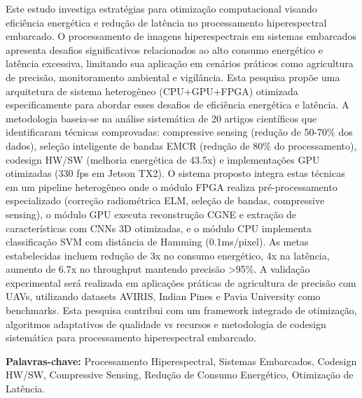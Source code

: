 \documentclass[12pt,Final,Portugues]{tese-FT}
\begin{document}
\begin{resumo}

Este estudo investiga estratégias para otimização computacional visando eficiência energética e redução de latência no processamento hiperespectral embarcado. O processamento de imagens hiperespectrais em sistemas embarcados apresenta desafios significativos relacionados ao alto consumo energético e latência excessiva, limitando sua aplicação em cenários práticos como agricultura de precisão, monitoramento ambiental e vigilância. Esta pesquisa propõe uma arquitetura de sistema heterogêneo (CPU+GPU+FPGA) otimizada especificamente para abordar esses desafios de eficiência energética e latência. A metodologia baseia-se na análise sistemática de 20 artigos científicos que identificaram técnicas comprovadas: compressive sensing (redução de 50-70\% dos dados), seleção inteligente de bandas EMCR (redução de 80\% do processamento), codesign HW/SW (melhoria energética de 43.5x) e implementações GPU otimizadas (330 fps em Jetson TX2). O sistema proposto integra estas técnicas em um pipeline heterogêneo onde o módulo FPGA realiza pré-processamento especializado (correção radiométrica ELM, seleção de bandas, compressive sensing), o módulo GPU executa reconstrução CGNE e extração de características com CNNs 3D otimizadas, e o módulo CPU implementa classificação SVM com distância de Hamming (0.1ms/pixel). As metas estabelecidas incluem redução de 3x no consumo energético, 4x na latência, aumento de 6.7x no throughput mantendo precisão >95\%. A validação experimental será realizada em aplicações práticas de agricultura de precisão com UAVs, utilizando datasets AVIRIS, Indian Pines e Pavia University como benchmarks. Esta pesquisa contribui com um framework integrado de otimização, algoritmos adaptativos de qualidade vs recursos e metodologia de codesign sistemática para processamento hiperespectral embarcado.

\textbf{Palavras-chave:} Processamento Hiperespectral, Sistemas Embarcados, Codesign HW/SW, Compressive Sensing, Redução de Consumo Energético, Otimização de Latência.
\end{resumo}
\end{document}
